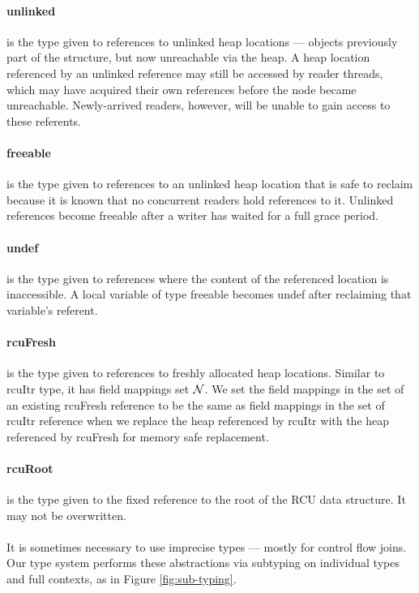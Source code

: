 \paragraph{unlinked} is the type given to references to unlinked heap locations --- objects previously part of the structure, but now unreachable via the heap. A heap location referenced by an unlinked reference may still be accessed by reader threads, which may have acquired their own references before the node became unreachable. Newly-arrived readers, however, will be unable to gain access to these referents.
\paragraph{freeable} is the type given to references to an unlinked heap location that is safe to reclaim because it is known that no concurrent readers hold references to it.
Unlinked references become freeable after a writer has waited for a full grace period.
\paragraph{undef} is the type given to references where the content of the referenced location is inaccessible. A local variable of type \textsf{freeable} becomes \textsf{undef} after reclaiming that variable's referent.
\paragraph{rcuFresh} is the type given to references to freshly allocated heap locations. Similar to \textsf{rcuItr} type, it has field mappings set $\mathcal{N}$. We set the field mappings in the set of an existing \textsf{rcuFresh} reference to be the same as field mappings in the set of \textsf{rcuItr} reference when we replace the heap referenced by \textsf{rcuItr} with the heap referenced by \textsf{rcuFresh} for memory safe replacement.
\paragraph{rcuRoot} is the type given to the fixed reference to the root of the RCU data structure.  It may not be overwritten.
\paragraph{}
It is sometimes necessary to use imprecise types --- mostly for control flow joins.  Our type system performs these abstractions via subtyping on individual types and full contexts, as in Figure \ref{fig:sub-typing}.

